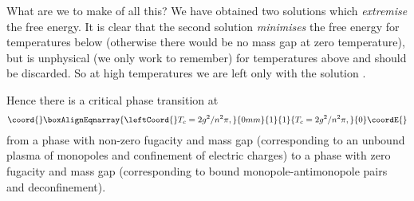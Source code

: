 \documentclass[a4paper,a4paper]{article}
\begin{document}
What are we to make of all this? We have obtained two solutions which \emph{extremise} the free energy. 
It is clear that the second solution \emph{minimises} the free energy for temperatures below \coordHE{}
(otherwise there would be no mass gap at zero temperature), but is unphysical (we only work to \coordHE{} remember)
for temperatures above \coordHE{} and should be discarded. So at high temperatures we are left only with the solution \coordHE{}.

Hence there is a critical phase transition at 
\begin{gather}\coord{}\boxAlignEqnarray{ \label{T_c}
\leftCoord{}T_c = 2 g^2/n^2\pi, 
}{0mm}{1}{1}{ T_c = 2 g^2/n^2\pi, 
}{0}\coordE{}\end{gather}
from a phase with non-zero fugacity and mass gap
(corresponding to an unbound plasma of monopoles and confinement of electric charges)
 to a phase with zero fugacity and mass gap
(corresponding to bound monopole-antimonopole pairs and deconfinement). 
\end{document}
